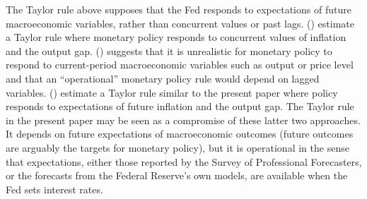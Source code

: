 \documentclass[12pt]{article}
\newcommand{\citee}[1]{\citeauthor{#1} (\citeyear{#1})}
\begin{document}
The Taylor rule above supposes that the Fed responds to expectations of future macroeconomic variables, rather than concurrent values or past lags.  \citee{juddrude} estimate a Taylor rule where monetary policy responds to concurrent values of inflation and the output gap.  \citee{mccallum1997} suggests that it is unrealistic for monetary policy to respond to current-period macroeconomic variables such as output or price level and that an ``operational'' monetary policy rule would depend on lagged variables.  \citee{cgg2000} estimate a Taylor rule similar to the present paper where policy responds to expectations of future inflation and the output gap.  The Taylor rule in the present paper may be seen as a compromise of these latter two approaches.  It depends on future expectations of macroeconomic outcomes (future outcomes are arguably the targets for monetary policy), but it is operational in the sense that expectations, either those reported by the Survey of Professional Forecasters, or the forecasts from the Federal Reserve's own models, are available when the Fed sets interest rates. 
\end{document}
